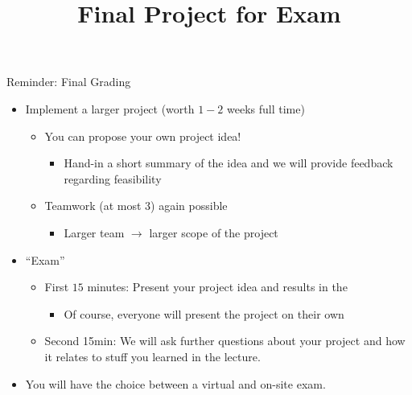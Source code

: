 


\title[RL: Exam]{Final Project for Exam}




	
	\maketitle

\begin{frame}[c]{Reminder: Final Grading}
	
	\begin{itemize}
		\item Implement a larger project (worth $1-2$ weeks full time)
		\begin{itemize}
			\item You can propose your own project idea!
			\begin{itemize}
				\item Hand-in a short summary of the idea and we will provide feedback regarding feasibility
			\end{itemize}
			\item Teamwork (at most 3) again possible
			\begin{itemize}
				\item Larger team $\to$ larger scope of the project
			\end{itemize}
		\end{itemize}
		\item ``Exam''
		\begin{itemize}
			\item First $15$ minutes: Present your project idea and results in the 
			\begin{itemize}
				\item Of course, everyone will present the project on their own
			\end{itemize}
			\item Second 15min: We will ask further questions about your project and how it relates to stuff you learned in the lecture.
		\end{itemize}	
		\item You will have the choice between a virtual and on-site exam.
	\end{itemize}
	
\end{frame}
